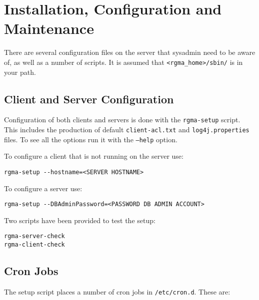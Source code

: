 \section{Installation, Configuration and Maintenance}

There are several configuration files on the server that sysadmin need
to be aware of, as well as a number of scripts. It is assumed
that \verb|<rgma_home>/sbin/| is in your path.

\subsection{Client and Server Configuration}
\label{sec:conf}
Configuration of both clients and servers is done with the
\texttt{rgma-setup} script. This includes the production of default
\texttt{client-acl.txt} and \texttt{log4j.properties} files. To see
all the options run it with the \texttt{--help} option.

To configure a client that is not running on the server use:

\begin{verbatim}
rgma-setup --hostname=<SERVER HOSTNAME>
\end{verbatim}

To configure a server use:

\begin{verbatim}
rgma-setup --DBAdminPassword=<PASSWORD DB ADMIN ACCOUNT>
\end{verbatim}

Two scripts have been provided to test the setup:

\begin{verbatim}
rgma-server-check
rgma-client-check
\end{verbatim}

\subsection{Cron Jobs}
The setup script places a number of cron jobs in
\texttt{/etc/cron.d}. These are:

